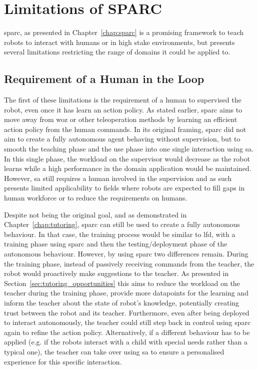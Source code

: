 \section{Limitations of SPARC} \label{sec:disc_limitations}

\gls{sparc}, as presented in Chapter~\ref{chap:sparc} is a promising framework to teach robots to interact with humans or in high stake environments, but presents several limitations restricting the range of domains it could be applied to.

\subsection{Requirement of a Human in the Loop}
The first of these limitations is the requirement of a human to supervised the robot, even once it has learn an action policy. As stated earlier, \gls{sparc} aims to move away from \gls{woz} or other teleoperation methods by learning an efficient action policy from the human commands. In its original framing, \gls{sparc} did not aim to create a fully autonomous agent behaving without supervision, but to smooth the teaching phase and the use phase into one single interaction using \gls{sa}. In this single phase, the workload on the supervisor would decrease as the robot learns while a high performance in the domain application would be maintained. However, \gls{sa} still requires a human involved in the supervision and as such presents limited applicability to fields where robots are expected to fill gaps in human workforce or to reduce the requirements on humans. 

Despite not being the original goal, and as demonstrated in Chapter~\ref{chap:tutoring}, \gls{sparc} can still be used to create a fully autonomous behaviour. In that case, the training process would be similar to \gls{lfd}, with a training phase using \gls{sparc} and then the testing/deployment phase of the autonomous behaviour. However, by using \gls{sparc} two differences remain. During the training phase, instead of passively receiving commands from the teacher, the robot would proactively make suggestions to the teacher. As presented in Section~\ref{sec:tutoring_opportunities} this aims to reduce the workload on the teacher during the training phase, provide more datapoints for the learning and inform the teacher about the state of robot's knowledge, potentially creating trust between the robot and its teacher. Furthermore, even after being deployed to interact autonomously, the teacher could still step back in control using \gls{sparc} again to refine the action policy. Alternatively, if a different behaviour has to be applied (e.g. if the robots interact with a child with special needs rather than a typical one), the teacher can take over using \gls{sa} to ensure a personalised experience for this specific interaction.


